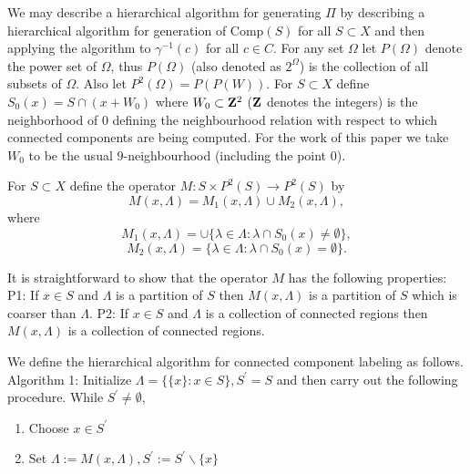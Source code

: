 \documentclass[12pt,twoside]{article}
\begin{document}
We may describe a hierarchical algorithm for generating $\Pi$ by describing a hierarchical algorithm
for generation of Comp$(S)$ for all $S \subset X$ and then applying the algorithm to $\gamma^{-1}(c)$ for all $c\in C$. For any set $\Omega$ let $P(\Omega)$ denote the power set of $\Omega$, thus $P(\Omega)$ (also denoted as $2^{\Omega}$) is the collection of all subsets of $\Omega$. Also let $P^2(\Omega) = P(P(W))$. For $S \subset X$ define $S_0(x) = S \cap (x + W_0)$ where $W_0 \subset {\bf Z}^2$ (${\bf Z}$ denotes the integers) is the neighborhood of $0$ defining the neighbourhood relation
with respect to which connected components are being computed. For the work of this paper
we take $W_0$ to be the usual $9$-neighbourhood (including the point $0$).

For $S \subset X$ define the operator $M : S \times P^2(S) \rightarrow P^2(S)$ by
\begin{equation}
M(x,\Lambda) = {M_1(x,\Lambda)} \cup M_2(x,\Lambda),
\end{equation}
where
\begin{equation}
M_1(x,\Lambda) = \cup\{\lambda\in\Lambda : \lambda \cap S_0(x) \neq\emptyset\},
\end{equation}
\begin{equation}
M_2(x,\Lambda) = \{\lambda\in\Lambda : \lambda\cap S_0(x) = \emptyset\}.
\end{equation}

It is straightforward to show that the operator $M$ has the following properties: \newline
P1: If $x \in S$ and $\Lambda$ is a partition of $S$ then $M(x,\Lambda)$ is a partition of $S$ which is coarser than $\Lambda$. \newline
P2: If $x \in S$ and $\Lambda$ is a collection of connected regions then $M(x,\Lambda)$ is a collection of connected
regions.

We define the hierarchical algorithm for connected component labeling as follows. \newline
Algorithm 1: \newline
Initialize $\Lambda= \{\{x\} : x \in S\}, S^{\prime} = S$ and then carry out the following procedure. \newline
While $S^{\prime}\neq\emptyset$,
\begin{enumerate}
\item Choose $x\in S^{\prime}$
\item Set $\Lambda := M(x,\Lambda), S^{\prime}:=S^{\prime}\backslash\{x\}$
\end{enumerate}
\end{document}
